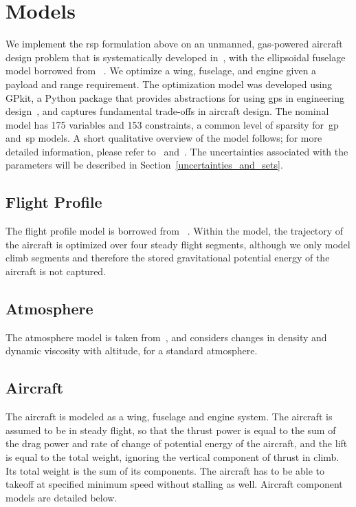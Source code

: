 \section{Models}

We implement the \gls{rsp} formulation above on an unmanned, gas-powered
aircraft design problem that is systematically developed in~\cite{Ozturk2018},
with the ellipsoidal fuselage model borrowed from ~\cite{Burton2018}.
We optimize a wing, fuselage, and engine given a payload and range requirement.
The optimization model was developed using GPkit, a Python package that
provides abstractions for using \gls{gp}s in engineering design~\cite{gpkit}, and
captures fundamental trade-offs in aircraft design.
The nominal model has 175 variables and 153 constraints, a common level of
sparsity for~\gls{gp} and~\gls{sp} models.
A short qualitative overview of the model follows; for
more detailed information, please refer to~\cite{Burton2018} and~\cite{Ozturk2018}. The uncertainties
associated with the parameters will be described in Section~\ref{uncertainties_and_sets}.

\subsection{Flight Profile}

The flight profile model is borrowed from ~\cite{York2018}. Within the model, the
trajectory of the aircraft is optimized over four steady flight segments,
although we only model climb segments
and therefore the stored gravitational potential energy of the aircraft is not captured.

\subsection{Atmosphere}

The atmosphere model is taken from~\cite{Tao2018}, and considers changes in density and dynamic
viscosity with altitude, for a standard atmosphere.

\subsection{Aircraft}

The aircraft is modeled as a wing, fuselage and engine system. The aircraft is assumed
to be in steady flight, so that the thrust power is equal to the sum of the drag power and rate of change
of potential energy of the aircraft, and the lift is equal to the total weight, ignoring the vertical component of
thrust in climb. Its total weight is the sum of its components.
The aircraft has to be able to takeoff at specified minimum speed without stalling as well.
Aircraft component models are detailed below.

